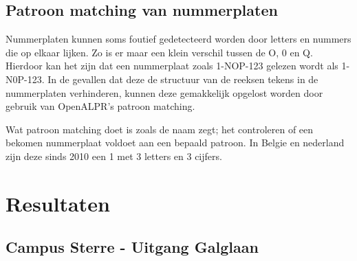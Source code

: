 \subsection{Patroon matching van nummerplaten}
Nummerplaten kunnen soms foutief gedetecteerd worden door letters en nummers die op elkaar lijken. Zo is er maar een klein verschil tussen de O, 0 en Q. 
Hierdoor kan het zijn dat een nummerplaat zoals 1-NOP-123 gelezen wordt als 1-N0P-123. In de gevallen dat deze de structuur van de reeksen tekens in de nummerplaten verhinderen, kunnen deze gemakkelijk opgelost worden door gebruik van OpenALPR's patroon matching.

Wat patroon matching doet is zoals de naam zegt; het controleren of een bekomen nummerplaat voldoet aan een bepaald patroon. In Belgie en nederland zijn deze sinds 2010 een 1 met 3 letters en 3 cijfers.

\section{Resultaten}

\subsection{Campus Sterre - Uitgang Galglaan}

